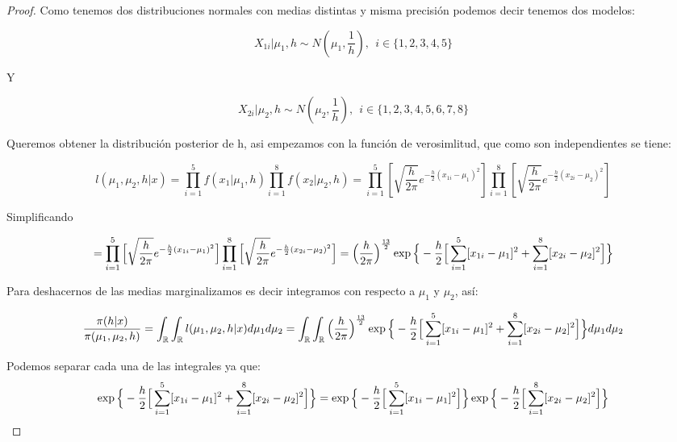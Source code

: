 \documentclass[11pt,letterpaper]{article}
\begin{document}
\begin{proof}

    Como tenemos dos distribuciones normales con medias distintas y misma precisión podemos decir tenemos dos modelos:

    \[
    X_{1i}|\mu_1,h \sim N(\mu_1,\frac{1}{h}), \ \ i\in \{1,2,3,4,5\}
    \]
    
    Y

    \[
    X_{2i}|\mu_2,h \sim N(\mu_2,\frac{1}{h}), \ \ i\in \{1,2,3,4,5,6,7,8\}
    \]

    Queremos obtener la distribución posterior de h, asi empezamos con la función de verosimlitud, que como son independientes se tiene:

    \begin{equation*}
        l(\mu_1,\mu_2,h|x) = \prod^5_{i=1}f(x_1|\mu_1,h)\prod^8_{i=1}f(x_2|\mu_2,h)=\prod^5_{i=1}[
        \sqrt{\frac{h}{2\pi}}e^{-\frac{h}{2}(x_{1i}-\mu_1)^2}]\prod^8_{i=1}[
        \sqrt{\frac{h}{2\pi}}e^{-\frac{h}{2}(x_{2i}-\mu_2)^2}]
    \end{equation*}

    Simplificando

    \begin{equation*}
        =\prod^5_{i=1}\Big{[}
        \sqrt{\frac{h}{2\pi}}e^{-\frac{h}{2}(x_{1i}-\mu_1)^2}\Big{]}\prod^8_{i=1}\Big{[}
        \sqrt{\frac{h}{2\pi}}e^{-\frac{h}{2}(x_{2i}-\mu_2)^2}\Big{]}=\Big{(}\frac{h}{2\pi}\Big{)}^\frac{13}{2}\exp\Big{\{}-\frac{h}{2}\Big{[}\sum_{i=1}^5[x_{1i}-\mu_1]^2+\sum_{i=1}^8[x_{2i}-\mu_2]^2\Big{]}\Big{\}}
    \end{equation*}

    Para deshacernos de las medias marginalizamos es decir integramos con respecto a $\mu_1$ y $\mu_2$, así:

    \begin{equation*}
        \frac{\pi(h|x)}{\pi(\mu_1,\mu_2,h)}=\int_{\mathbb{R}}\int_{\mathbb{R}}l(\mu_1,\mu_2,h|x)d\mu_1d\mu_2=\int_{\mathbb{R}}\int_{\mathbb{R}}\Big{(}\frac{h}{2\pi}\Big{)}^\frac{13}{2}\exp\Big{\{}-\frac{h}{2}\Big{[}\sum_{i=1}^5[x_{1i}-\mu_1]^2+\sum_{i=1}^8[x_{2i}-\mu_2]^2\Big{]}\Big{\}}d\mu_1d\mu_2
    \end{equation*}

    Podemos separar cada una de las integrales ya que: 
    \[
    \exp\Big{\{}-\frac{h}{2}\Big{[}\sum_{i=1}^5[x_{1i}-\mu_1]^2+\sum_{i=1}^8[x_{2i}-\mu_2]^2\Big{]}\Big{\}}=\exp\Big{\{}-\frac{h}{2}\Big{[}\sum_{i=1}^5[x_{1i}-\mu_1]^2\Big{]}\Big{\}}\exp\Big{\{}-\frac{h}{2}\Big{[}\sum_{i=1}^8[x_{2i}-\mu_2]^2\Big{]}\Big{\}}
    \]


\end{proof}
\end{document}
